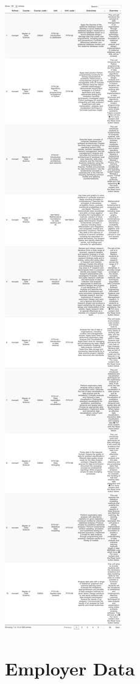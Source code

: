 \documentclass[
  letterpaper,
  DIV=11,
  numbers=noendperiod]{scrreport}
\begin{document}
\includegraphics{./03_1-webscraping_files/figure-pdf/unnamed-chunk-1-1.pdf}

\hypertarget{employer-data}{%
\chapter{Employer Data}\label{employer-data}}
\end{document}
